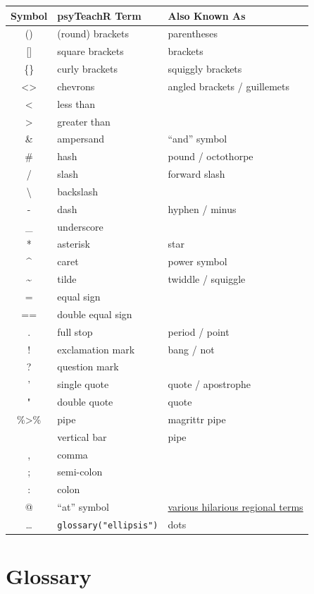 \documentclass[
  oneside]{book}
\begin{document}
\begin{longtable}[]{@{}cll@{}}
\toprule
Symbol & psyTeachR Term & Also Known As \\
\midrule
\endhead
() & (round) brackets & parentheses \\
{[}{]} & square brackets & brackets \\
\{\} & curly brackets & squiggly brackets \\
\textless\textgreater{} & chevrons & angled brackets / guillemets \\
\textless{} & less than & \\
\textgreater{} & greater than & \\
\& & ampersand & ``and'' symbol \\
\# & hash & pound / octothorpe \\
/ & slash & forward slash \\
\textbackslash{} & backslash & \\
- & dash & hyphen / minus \\
\_ & underscore & \\
* & asterisk & star \\
\^{} & caret & power symbol \\
\textasciitilde{} & tilde & twiddle / squiggle \\
= & equal sign & \\
== & double equal sign & \\
. & full stop & period / point \\
! & exclamation mark & bang / not \\
? & question mark & \\
' & single quote & quote / apostrophe \\
" & double quote & quote \\
\%\textgreater\% & pipe & magrittr pipe \\
\textbar{} & vertical bar & pipe \\
, & comma & \\
; & semi-colon & \\
: & colon & \\
@ & ``at'' symbol & \href{https://www.theguardian.com/notesandqueries/query/0,5753,-1773,00.html}{various hilarious regional terms} \\
\ldots{} & \texttt{glossary("ellipsis")} & dots \\
\bottomrule
\end{longtable}

\hypertarget{glossary}{%
\chapter{Glossary}\label{glossary}}
\end{document}
